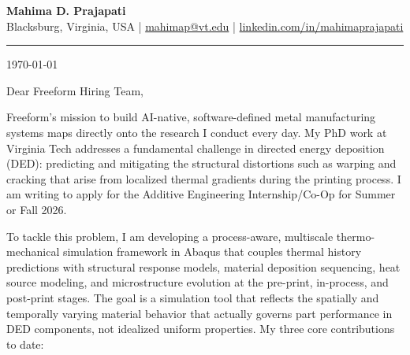 \documentclass[11pt, a4paper]{article}
\begin{document}
\begin{center}
    {\LARGE \textbf{Mahima D. Prajapati}}\\[4pt]
    Blacksburg, Virginia, USA \quad|\quad
    \href{mailto:mahimap@vt.edu}{mahimap@vt.edu} \quad|\quad
    \href{https://linkedin.com/in/mahimaprajapati}{linkedin.com/in/mahimaprajapati}
\end{center}

\vspace{8pt}
\hrule
\vspace{16pt}

\today

\vspace{16pt}

Dear Freeform Hiring Team,

Freeform's mission to build AI-native, software-defined metal manufacturing systems maps directly onto the research I conduct every day. My PhD work at Virginia Tech addresses a fundamental challenge in directed energy deposition (DED): predicting and mitigating the structural distortions such as warping and cracking that arise from localized thermal gradients during the printing process. I am writing to apply for the Additive Engineering Internship/Co-Op for Summer or Fall 2026.

To tackle this problem, I am developing a process-aware, multiscale thermo-mechanical simulation framework in Abaqus that couples thermal history predictions with structural response models, material deposition sequencing, heat source modeling, and microstructure evolution at the pre-print, in-process, and post-print stages. The goal is a simulation tool that reflects the spatially and temporally varying material behavior that actually governs part performance in DED components, not idealized uniform properties. My three core contributions to date:
\end{document}
